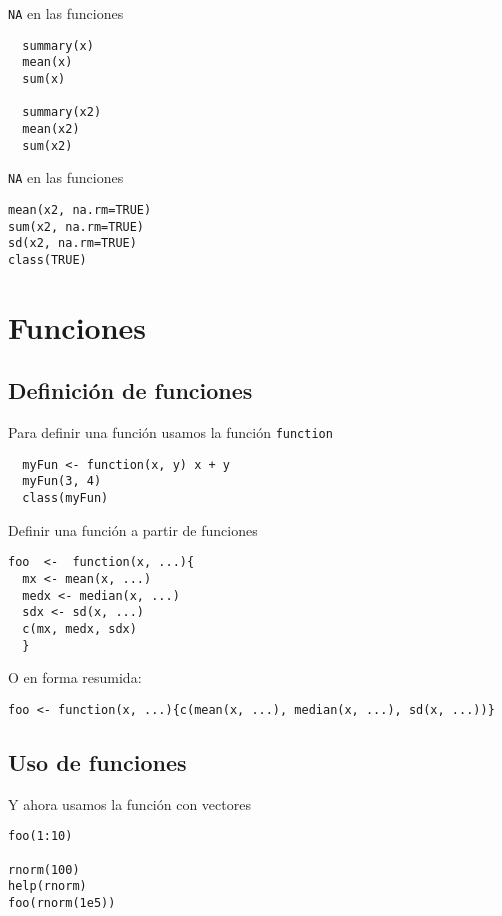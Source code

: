 \documentclass[xcolor={usenames,svgnames,dvipsnames}]{beamer}
\begin{document}
\begin{frame}[fragile,label=sec-2-3-2]{\texttt{NA} en las funciones}
 \lstset{language=R,label= ,caption= ,numbers=none}
\begin{lstlisting}
  summary(x)
  mean(x)
  sum(x)
  
  summary(x2)
  mean(x2)
  sum(x2)
\end{lstlisting}
\end{frame}

\begin{frame}[fragile,label=sec-2-3-3]{\texttt{NA} en las funciones}
 \lstset{language=R,label= ,caption= ,numbers=none}
\begin{lstlisting}
mean(x2, na.rm=TRUE)
sum(x2, na.rm=TRUE)
sd(x2, na.rm=TRUE)
class(TRUE)
\end{lstlisting}
\end{frame}


\section{Funciones}
\label{sec-3}

\subsection{Definición de funciones}
\label{sec-3-1}
\begin{frame}[fragile,label=sec-3-1-1]{Para definir una función usamos la función \texttt{function}}
 \lstset{language=R,label= ,caption= ,numbers=none}
\begin{lstlisting}
  myFun <- function(x, y) x + y
  myFun(3, 4)
  class(myFun)
\end{lstlisting}
\end{frame}

\begin{frame}[fragile,label=sec-3-1-2]{Definir una función a partir de funciones}
 \lstset{language=R,label= ,caption= ,numbers=none}
\begin{lstlisting}
foo  <-  function(x, ...){
  mx <- mean(x, ...)
  medx <- median(x, ...)
  sdx <- sd(x, ...)
  c(mx, medx, sdx)
  }
\end{lstlisting}
O en forma resumida:
\lstset{language=R,label= ,caption= ,numbers=none}
\begin{lstlisting}
foo <- function(x, ...){c(mean(x, ...), median(x, ...), sd(x, ...))}
\end{lstlisting}
\end{frame}


\subsection{Uso de funciones}
\label{sec-3-2}
\begin{frame}[fragile,label=sec-3-2-1]{Y ahora usamos la función con vectores}
 \lstset{language=R,label= ,caption= ,numbers=none}
\begin{lstlisting}
foo(1:10)

rnorm(100)
help(rnorm)
foo(rnorm(1e5))
\end{lstlisting}
\end{frame}
\end{document}
